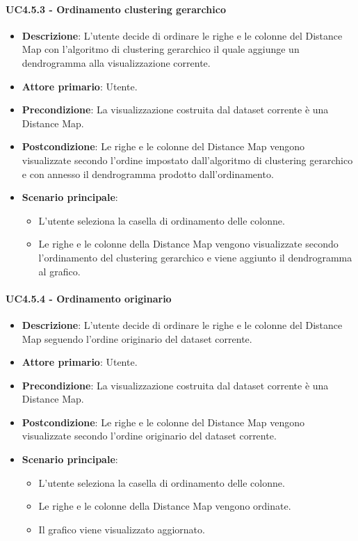 \paragraph{UC4.5.3 - Ordinamento clustering gerarchico}
\label{par:uc4.5.3}
\begin{itemize}
    \item \textbf{Descrizione}: L'utente decide di ordinare le righe e le colonne del Distance Map con l'algoritmo di clustering gerarchico il quale aggiunge un dendrogramma alla visualizzazione corrente.
    \item \textbf{Attore primario}: Utente.
    \item \textbf{Precondizione}: La visualizzazione costruita dal dataset corrente è una Distance Map.
    \item \textbf{Postcondizione}: Le righe e le colonne del Distance Map vengono visualizzate secondo l'ordine impostato dall'algoritmo di clustering gerarchico e con annesso il dendrogramma prodotto dall'ordinamento.
    \item \textbf{Scenario principale}:
    \begin{itemize}
        \item L'utente seleziona la casella di ordinamento delle colonne.
        \item Le righe e le colonne della Distance Map vengono visualizzate secondo l'ordinamento del clustering gerarchico e viene aggiunto il dendrogramma al grafico.
    \end{itemize}
\end{itemize}

\paragraph{UC4.5.4 - Ordinamento originario}
\label{par:uc4.5.4}
\begin{itemize}
    \item \textbf{Descrizione}: L'utente decide di ordinare le righe e le colonne del Distance Map seguendo l'ordine originario del dataset corrente.
    \item \textbf{Attore primario}: Utente.
    \item \textbf{Precondizione}: La visualizzazione costruita dal dataset corrente è una Distance Map.
    \item \textbf{Postcondizione}: Le righe e le colonne del Distance Map vengono visualizzate secondo l'ordine originario del dataset corrente.
    \item \textbf{Scenario principale}:
    \begin{itemize}
        \item L'utente seleziona la casella di ordinamento delle colonne.
        \item Le righe e le colonne della Distance Map vengono ordinate.
        \item Il grafico viene visualizzato aggiornato.
    \end{itemize}
\end{itemize}

